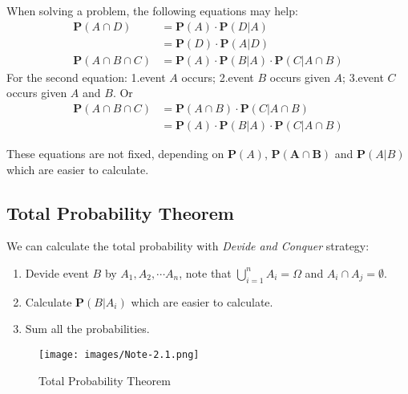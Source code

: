 When solving a problem, the following equations may help:
\begin{align}
    \mathbf{P}(A \cap D) &= \mathbf{P}(A) \cdot \mathbf{P}(D|A) \\
    &= \mathbf{P}(D) \cdot \mathbf{P}(A|D) \\
    \mathbf{P}(A \cap B \cap C) &= \mathbf{P}(A) \cdot \mathbf{P}(B|A) \cdot \mathbf{P}(C|A \cap B)
\end{align}
For the second equation: 1.event $A$ occurs; 2.event $B$ occurs given $A$; 3.event $C$ occurs given $A$ and $B$. Or
\begin{align*}
    \mathbf{P}(A \cap B \cap C) &= \mathbf{P}(A \cap B) \cdot \mathbf{P}(C | A \cap B) \\ 
    &= \mathbf{P}(A) \cdot \mathbf{P}(B | A) \cdot \mathbf{P}(C | A \cap B)
\end{align*}
\begin{remark}
    These equations are not fixed, depending on $\mathbf{P}(A)$, $\mathbf{P(A \cap B)}$ and $\mathbf{P}(A | B)$ which are easier to calculate.
\end{remark}

\subsection{Total Probability Theorem}
We can calculate the total probability with \textit{Devide and Conquer} strategy:
\begin{enumerate}
    \item Devide event $B$ by $A_1, A_2, \cdots A_n$, note that $\bigcup_{i=1}^n A_i = \Omega$ and $A_i \cap A_j = \emptyset$.
    \item Calculate $\mathbf{P}(B | A_i)$ which are easier to calculate.
    \item Sum all the probabilities.
\end{enumerate}
\begin{figure}[H]
    \centering
    \texttt{[image: images/Note-2.1.png]}
    \caption{Total Probability Theorem}
    \label{fig:total-probability}
\end{figure}

